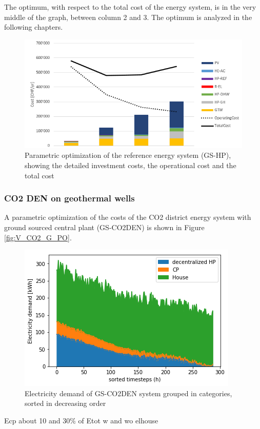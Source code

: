 \documentclass{article}
\begin{document}
The optimum, with respect to the total cost of the energy system, is in the very middle of the graph, between column 2 and 3. The optimum is analyzed in the following chapters.

\begin{figure}[htp]
	\centering
	\includegraphics[width=1\textwidth]{V_G_PO1.png}
	\caption{Parametric optimization of the reference energy system (GS-HP), showing the detailed investment costs, the operational cost and the total cost}
	\label{fig:V_G_PO}
\end{figure}

\subsubsection{CO2 DEN on geothermal wells}
A parametric optimization of the costs of the CO2 district energy system with ground sourced central plant (GS-CO2DEN) is shown in Figure \ref{fig:V_CO2_G_PO}.

\begin{figure}[tph]
	\centering
	\includegraphics[width=0.5\linewidth]{Images/V_CO2_eldem_sorted}
	\caption{Electricity demand of GS-CO2DEN system grouped in categories, sorted in decreasing order}
	\label{fig:gsco2_el}
\end{figure}

Ecp about 10 and 30\% of Etot w and wo elhouse\\
\end{document}
